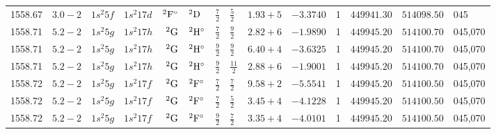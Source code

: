 \begin{table}
\begin{tabular}{rrr@{ -- }lr@{ -- }lr@{ -- }llrrr@{ -- }rl}
   1558.67\phantom{00000000} & $3.0-2$ &  $1s^{2}5f$ & $1s^{2}17d$ & $^{2}{\rm F}^\circ$ & $^{2}{\rm D}$       &  $\frac{7}{2}$ & $\frac{5}{2}$  & $1.93+5$ & $ -3.3740$ &     1 & $449941.30$ & $514098.50$ & 045 \\
   1558.71\phantom{00000000} & $5.2-2$ &  $1s^{2}5g$ & $1s^{2}17h$ &       $^{2}{\rm G}$ & $^{2}{\rm H}^\circ$ &  $\frac{7}{2}$ & $\frac{9}{2}$  & $2.82+6$ & $ -1.9890$ &     1 & $449945.20$ & $514100.70$ & 045,070 \\
   1558.71\phantom{00000000} & $5.2-2$ &  $1s^{2}5g$ & $1s^{2}17h$ &       $^{2}{\rm G}$ & $^{2}{\rm H}^\circ$ &  $\frac{9}{2}$ & $\frac{9}{2}$  & $6.40+4$ & $ -3.6325$ &     1 & $449945.20$ & $514100.70$ & 045,070 \\
   1558.71\phantom{00000000} & $5.2-2$ &  $1s^{2}5g$ & $1s^{2}17h$ &       $^{2}{\rm G}$ & $^{2}{\rm H}^\circ$ &  $\frac{9}{2}$ & $\frac{11}{2}$ & $2.88+6$ & $ -1.9001$ &     1 & $449945.20$ & $514100.70$ & 045,070 \\
   1558.72\phantom{00000000} & $5.2-2$ &  $1s^{2}5g$ & $1s^{2}17f$ &       $^{2}{\rm G}$ & $^{2}{\rm F}^\circ$ &  $\frac{7}{2}$ & $\frac{7}{2}$  & $9.58+2$ & $ -5.5541$ &     1 & $449945.20$ & $514100.50$ & 045,070 \\
   1558.72\phantom{00000000} & $5.2-2$ &  $1s^{2}5g$ & $1s^{2}17f$ &       $^{2}{\rm G}$ & $^{2}{\rm F}^\circ$ &  $\frac{7}{2}$ & $\frac{5}{2}$  & $3.45+4$ & $ -4.1228$ &     1 & $449945.20$ & $514100.50$ & 045,070 \\
   1558.72\phantom{00000000} & $5.2-2$ &  $1s^{2}5g$ & $1s^{2}17f$ &       $^{2}{\rm G}$ & $^{2}{\rm F}^\circ$ &  $\frac{9}{2}$ & $\frac{7}{2}$  & $3.35+4$ & $ -4.0101$ &     1 & $449945.20$ & $514100.50$ & 045,070 \\
\hline
\end{tabular}
\end{table}